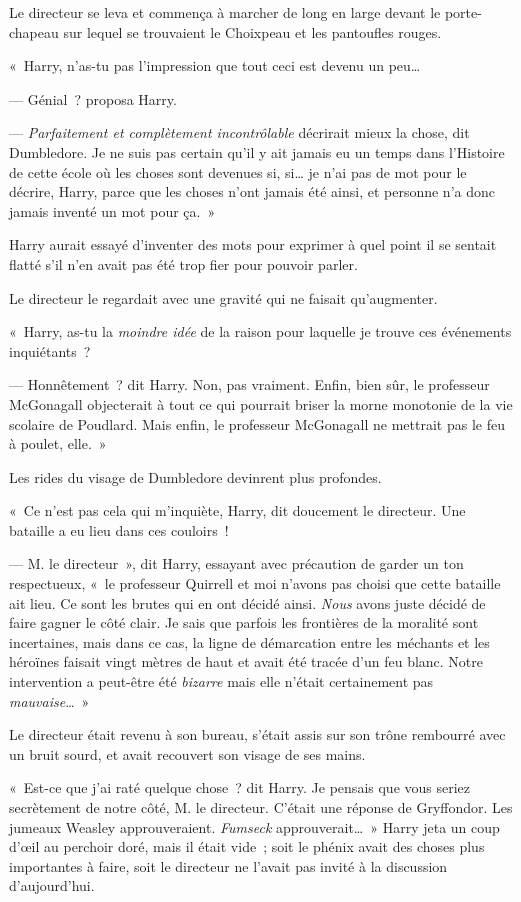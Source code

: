 Le directeur se leva et commença à marcher de long en large devant le porte-chapeau sur lequel se trouvaient le Choixpeau et les pantoufles rouges.

«~Harry, n'as-tu pas l'impression que tout ceci est devenu un peu…

--- Génial~? proposa Harry.

--- \emph{Parfaitement et complètement incontrôlable} décrirait mieux la chose, dit Dumbledore. Je ne suis pas certain qu'il y ait jamais eu un temps dans l'Histoire de cette école où les choses sont devenues si, si… je n'ai pas de mot pour le décrire, Harry, parce que les choses n'ont jamais été ainsi, et personne n'a donc jamais inventé un mot pour ça.~»

Harry aurait essayé d'inventer des mots pour exprimer à quel point il se sentait flatté s'il n'en avait pas été trop fier pour pouvoir parler.

Le directeur le regardait avec une gravité qui ne faisait qu'augmenter.

«~Harry, as-tu la \emph{moindre idée} de la raison pour laquelle je trouve ces événements inquiétants~?

--- Honnêtement~? dit Harry. Non, pas vraiment. Enfin, bien sûr, le professeur McGonagall objecterait à tout ce qui pourrait briser la morne monotonie de la vie scolaire de Poudlard. Mais enfin, le professeur McGonagall ne mettrait pas le feu à poulet, elle.~»

Les rides du visage de Dumbledore devinrent plus profondes.

«~Ce n'est pas cela qui m'inquiète, Harry, dit doucement le directeur. Une bataille a eu lieu dans ces couloirs~!

--- M. le directeur~», dit Harry, essayant avec précaution de garder un ton respectueux, «~le professeur Quirrell et moi n'avons pas choisi que cette bataille ait lieu. Ce sont les brutes qui en ont décidé ainsi. \emph{Nous} avons juste décidé de faire gagner le côté clair. Je sais que parfois les frontières de la moralité sont incertaines, mais dans ce cas, la ligne de démarcation entre les méchants et les héroïnes faisait vingt mètres de haut et avait été tracée d'un feu blanc. Notre intervention a peut-être été \emph{bizarre} mais elle n'était certainement pas \emph{mauvaise}…~»

Le directeur était revenu à son bureau, s'était assis sur son trône rembourré avec un bruit sourd, et avait recouvert son visage de ses mains.

«~Est-ce que j'ai raté quelque chose~? dit Harry. Je pensais que vous seriez secrètement de notre côté, M. le directeur. C'était une réponse de Gryffondor. Les jumeaux Weasley approuveraient. \emph{Fumseck} approuverait…~» Harry jeta un coup d'œil au perchoir doré, mais il était vide~; soit le phénix avait des choses plus importantes à faire, soit le directeur ne l'avait pas invité à la discussion d'aujourd'hui.

